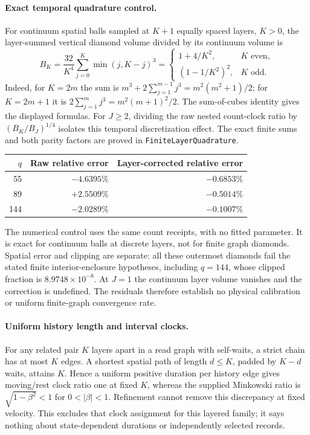 \paragraph{Exact temporal quadrature control.}
For continuum spatial balls sampled at $K+1$ equally spaced layers, $K>0$,
the layer-summed vertical diamond volume divided by its continuum volume is
\[
 B_K=\frac{32}{K^4}\sum_{j=0}^{K}\min(j,K-j)^3
 =\begin{cases}1+4/K^2,&K\text{ even},\\
 (1-1/K^2)^2,&K\text{ odd}.\end{cases}
\]
Indeed, for $K=2m$ the sum is
$m^3+2\sum_{j=1}^{m-1}j^3=m^2(m^2+1)/2$; for $K=2m+1$ it is
$2\sum_{j=1}^{m}j^3=m^2(m+1)^2/2$. The sum-of-cubes identity gives the
displayed formulas. For $J\ge2$, dividing the raw nested count-clock ratio
by $(B_K/B_J)^{1/4}$ isolates this temporal discretization effect.
The exact finite sums and both parity factors are proved in
\texttt{FiniteLayerQuadrature}.
\begin{center}
\begin{tabular}{r rr}
$q$ & Raw relative error & Layer-corrected relative error\\\hline
55 & $-4.6395\%$ & $-0.6853\%$\\
89 & $+2.5509\%$ & $-0.5014\%$\\
144 & $-2.0289\%$ & $-0.1007\%$
\end{tabular}
\end{center}
The numerical control uses the same count receipts, with no fitted
parameter. It is exact for continuum balls at discrete layers, not for
finite graph diamonds. Spatial error and clipping are separate: all these
outermost diamonds fail the stated finite interior-enclosure hypotheses,
including $q=144$, whose clipped fraction is $8.9748\times10^{-8}$.
At $J=1$ the continuum layer volume vanishes and the correction is undefined.
The residuals therefore establish no physical calibration or uniform
finite-graph convergence rate.

\paragraph{Uniform history length and interval clocks.}
For any related pair $K$ layers apart in a read graph with self-waits, a
strict chain has at most $K$ edges. A shortest spatial path of length
$d\le K$, padded by $K-d$ waits, attains $K$. Hence a uniform positive
duration per history edge gives moving/rest clock ratio one at fixed $K$,
whereas the supplied Minkowski ratio is $\sqrt{1-\beta^2}<1$ for
$0<|\beta|<1$. Refinement cannot remove this discrepancy at fixed velocity.
This excludes that clock assignment for this layered family; it says
nothing about state-dependent durations or independently selected records.

